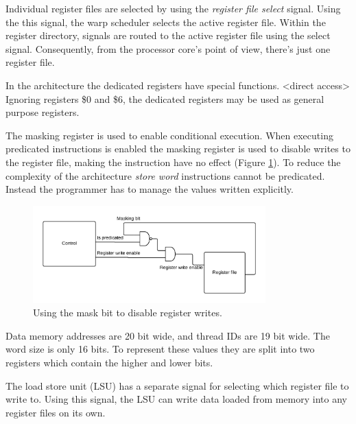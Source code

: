 Individual register files are selected by using the \emph{register file select} signal.
Using the this signal, the warp scheduler selects the active register file.
Within the register directory, signals are routed to the active register file using the select signal.
Consequently, from the processor core's point of view, there's just one register file.

In the architecture the dedicated registers have special functions.
<direct access>
Ignoring registers \$0 and \$6, the dedicated registers may be used as general purpose registers.


The masking register is used to enable conditional execution.
When executing predicated instructions is enabled the masking register is used to disable writes to the register file, making the instruction have no effect (Figure \ref{fig:masking}).
To reduce the complexity of the architecture \emph{store word} instructions cannot be predicated.
Instead the programmer has to manage the values written explicitly.
\begin{figure}[H]
	\centering
	\includegraphics[width=0.8\textwidth]{../gpu/diagrams/masking.png}
	\caption{Using the mask bit to disable register writes.}
	\label{fig:masking}
\end{figure}

Data memory addresses are 20 bit wide, and thread IDs are 19 bit wide.
The word size is only 16 bits.
To represent these values they are split into two registers which contain the higher and lower bits.

The load store unit (LSU) has a separate signal for selecting which register file to write to.
Using this signal, the LSU can write data loaded from memory into any register files on its own.
